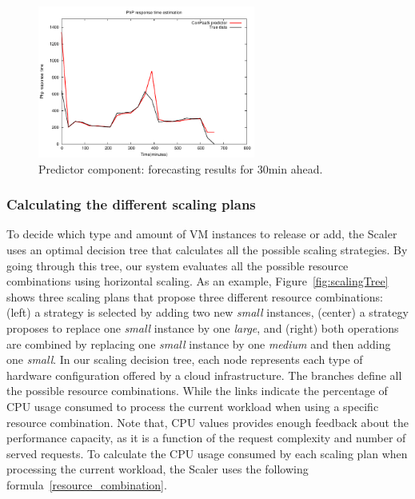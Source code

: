 \begin{figure}[htb]
  \begin{center}
    \includegraphics[height=5cm]{images/prediction_conpaas_30min}
  \end{center}
\vspace{-5mm}
  \caption{Predictor component: forecasting results for 30min ahead.}
  \label{fig:forecast}
\end{figure}

\subsubsection{Calculating the different scaling plans}

To decide which type and amount of VM instances to release or add, the Scaler uses an optimal decision tree that calculates all the possible scaling strategies. By going through this tree, our system evaluates all the possible resource combinations using horizontal scaling. As an example, Figure~\ref{fig:scalingTree} shows three scaling plans that propose three different resource combinations: (left) a strategy is selected by adding two new \emph{small} instances, (center) a strategy proposes to replace one \emph{small} instance by one \emph{large}, and (right) both operations are combined by replacing one \emph{small} instance by one \emph{medium} and then adding one \emph{small}. In our scaling decision tree, each node represents each type of hardware configuration offered by a cloud infrastructure. The branches define all the possible resource combinations. While the links indicate the percentage of CPU usage consumed to process the current workload when using a specific resource combination. Note that, CPU values provides enough feedback about the performance capacity, as it is a function of the request complexity  and number of served requests. To calculate the CPU usage consumed by each scaling plan when processing the current workload, the Scaler uses the following formula~\ref{resource_combination}. 

